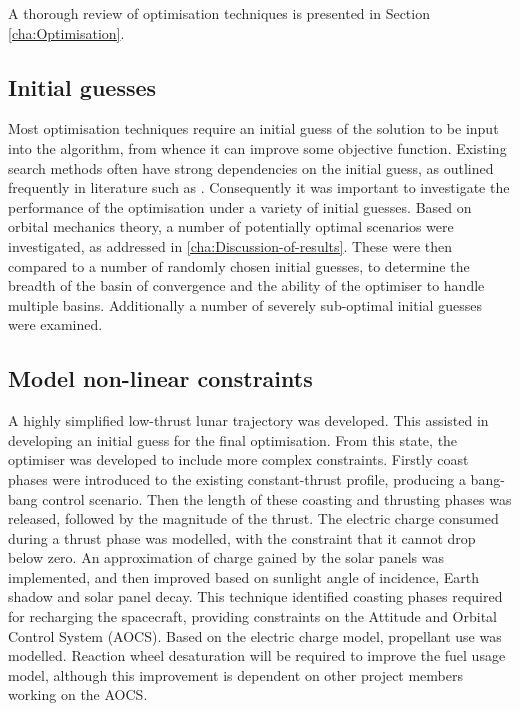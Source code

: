 A thorough review of optimisation techniques is presented in Section \ref{cha:Optimisation}.

\subsection{Initial guesses} \label{sub:Initial-guesses}

Most optimisation techniques require an initial guess of the solution to be input into the algorithm, from whence it can improve some objective function. Existing search methods often have strong dependencies on the initial guess, as outlined frequently in literature such as \textcite{Dachwald2005}. Consequently it was important to investigate the performance of the optimisation under a variety of initial guesses. Based on orbital mechanics theory, a number of potentially optimal scenarios were investigated, as addressed in \autoref{cha:Discussion-of-results}. These were then compared to a number of randomly chosen initial guesses, to determine the breadth of the basin of convergence and the ability of the optimiser to handle multiple basins. Additionally a number of severely sub-optimal initial guesses were examined.

\subsection{Model non-linear constraints} \label{sub:Model-non-linear-constraints}

A highly simplified low-thrust lunar trajectory was developed. This assisted in developing an initial guess for the final optimisation. From this state, the optimiser was developed to include more complex constraints. Firstly coast phases were introduced to the existing constant-thrust profile, producing a bang-bang control scenario. Then the length of these coasting and thrusting phases was released, followed by the magnitude of the thrust. The electric charge consumed during a thrust phase was modelled, with the constraint that it cannot drop below zero. An approximation of charge gained by the solar panels was implemented, and then improved based on sunlight angle of incidence, Earth shadow and solar panel decay. This technique identified coasting phases required for recharging the spacecraft, providing constraints on the Attitude and Orbital Control System (AOCS). Based on the electric charge model, propellant use was modelled. Reaction wheel desaturation will be required to improve the fuel usage model, although this improvement is dependent on other project members working on the AOCS.

